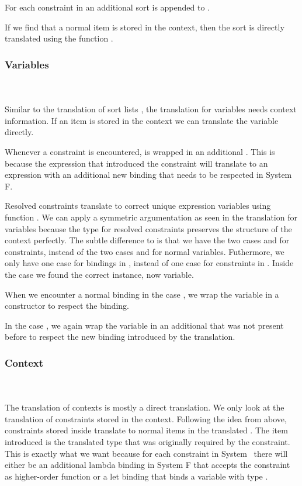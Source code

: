 \noindent For each constraint in  an additional sort  is appended to .

\noindent If we find that a normal item is stored in the context, then the sort  is directly translated using the function .

\subsubsection{Variables}\hfill\\\\
Similar to the translation of sort lists , the translation for variables needs context information.  
\DPTVar
If an item is stored in the context we can translate the variable directly. 

\noindent Whenever a constraint is encountered,  is wrapped in an additional . 
This is because the expression that introduced the constraint will translate to an expression with an additional new binding that needs to be respected in System F.

\noindent Resolved constraints translate to correct unique expression variables using function . We can apply a symmetric argumentation as seen in the translation for variables because the type for resolved constraints \Data{[}  \Data{]∈}  preserves the structure of the context perfectly. The subtle difference to  is that we have the two cases  and  for constraints, instead of the two cases  and  for normal variables. Futhermore, we only have one case for bindings  in , instead of one case for constraints in .
\DPTOVar
Inside the case  we found the correct instance, now variable.

\noindent When we encounter a normal binding in the case , we wrap the variable in a  constructor to respect the binding.

\noindent In the case , we again wrap the variable in an additional  that was not present before to respect the new binding introduced by the translation.
\subsubsection{Context}\hfill\\\\
The translation of contexts is mostly a direct translation. 
We only look at the translation of constraints stored in the context.
\DPTCtx
Following the idea from above, constraints  \Constr{:}  stored inside  translate to normal items in the translated . 
The item introduced is the translated type   that was originally required by the constraint. 
This is exactly what we want because for each constraint in System \Fo\ there will either be an additional lambda binding in System F that accepts the constraint as higher-order function or a let binding that binds a variable with type  . 


